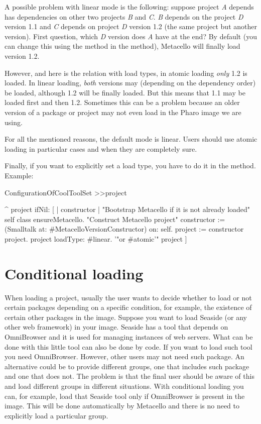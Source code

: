\documentclass[a4paper,10pt,twoside]{book}
\begin{document}
A possible problem with linear mode is the following: suppose project \emph{A} depends has dependencies on other two projects \emph{B} and \emph{C}. \emph{B} depends on the project \emph{D} version 1.1 and \emph{C} depends on project \emph{D} version 1.2 (the same project but another version). First question, which \emph{D} version does \emph{A} have at the end?  By default (you can change this using the method  in the  method), Metacello will finally load version 1.2.

However, and here is the relation with load types, in atomic loading \emph{only} 1.2 is loaded. In linear loading, \emph{both} versions may (depending on the dependency order) be loaded, although 1.2 will be finally loaded. But this means that 1.1 may be loaded first and then 1.2. Sometimes this can be a problem because an older version of a package or project may not even load in the Pharo image we are using. 

For all the mentioned reasons, the default mode is linear. Users should use atomic loading in particular cases and when they are completely sure. 

Finally, if you want to explicitly set a load type, you have to do it in the  method. Example:

\begin{code}{}
ConfigurationOfCoolToolSet >>project

	^ project ifNil: [ | constructor |
		"Bootstrap Metacello if it is not already loaded"
		self class ensureMetacello.
		"Construct Metacello project"
		constructor := (Smalltalk at: #MetacelloVersionConstructor) on: self.
		project := constructor project.
		project loadType: #linear. '"or #atomic'"
		project ]

\end{code}


\section{Conditional loading}
When loading a project, usually the user wants to decide whether to load or not certain packages depending on a specific condition, for example, the existence of certain other packages in the image. Suppose you want to load Seaside (or any other web framework) in your image. Seaside has a tool that depends on OmniBrowser and it is used for managing instances of web servers. What can be done with this little tool can also be done by code. If you want to load such tool you need OmniBrowser. However, other users may not need such package. An alternative could be to provide different groups, one that includes such package and one that does not. The problem is that the final user should be aware of this and load different groups in different situations.  With conditional loading you can, for example, load that Seaside tool only if OmniBrowser is present in the image. This will be done automatically by Metacello and there is no need to explicitly load a particular group. 
\end{document}
